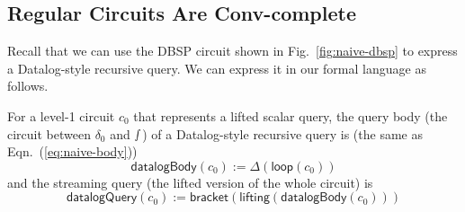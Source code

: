 


\subsection{Regular Circuits Are Conv-complete}\label{sec:regular-circuits}

Recall that we can use the DBSP circuit shown in Fig.~\ref{fig:naive-dbsp} to express a Datalog-style recursive query. We can express it in our formal language as follows.
\begin{definition}
    For a level-1 circuit $c_0$ that represents a lifted scalar query, the query body (the circuit between $\delta_0$ and $\smallint$) of a Datalog-style recursive query is (the same as Eqn.~(\ref{eq:naive-body}))
    \[\mathsf{datalogBody}(c_0) := \Delta(\mathsf{loop}(c_0))\]
    and the streaming query (the lifted version of the whole circuit) is
    \[\mathsf{datalogQuery}(c_0) := \mathsf{bracket}(\mathsf{lifting}(\mathsf{datalogBody}(c_0)))\]
\end{definition}

